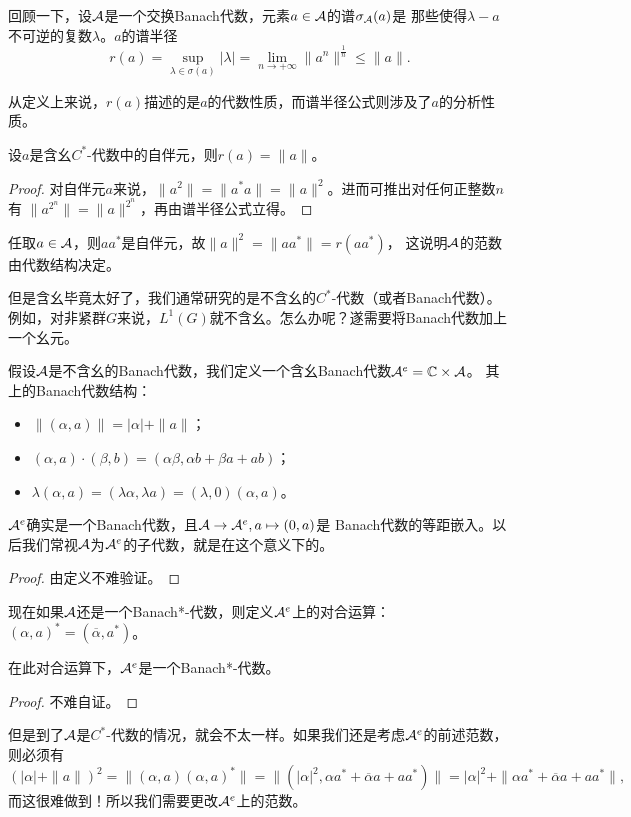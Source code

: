 回顾一下，设$\mathcal{A}$是一个交换Banach代数，元素$a \in \mathcal{A}$的谱$\sigma_{\mathcal{A}}(a)$是
那些使得$\lambda-a$不可逆的复数$\lambda$。$a$的谱半径
\[ r(a) = \sup_{\lambda \in \sigma(a)} |\lambda| 
= \lim_{n \to +\infty} \|a^n\|^{\frac{1}{n}} \leqslant \|a\|.\]

从定义上来说，$r(a)$描述的是$a$的代数性质，而谱半径公式则涉及了$a$的分析性质。
\begin{lemma}
    设$a$是含幺$C^*$-代数中的自伴元，则$r(a) = \|a\|$。
\end{lemma}
\begin{proof}
    对自伴元$a$来说，$\|a^2\| = \|a^*a\| = \|a\|^2$。进而可推出对任何正整数$n$有
    $\|a^{2^n}\| = \|a\|^{2^n}$，再由谱半径公式立得。
\end{proof}
\begin{remark}
    任取$a \in \mathcal{A}$，则$aa^*$是自伴元，故$\|a\|^2 = \|aa^*\| = r(aa^*)$，
    这说明$\mathcal{A}$的范数由代数结构决定。
\end{remark}
但是含幺毕竟太好了，我们通常研究的是不含幺的$C^*$-代数（或者Banach代数）。
例如，对非紧群$G$来说，$L^1(G)$就不含幺。怎么办呢？遂需要将Banach代数加上一个幺元。

假设$\mathcal{A}$是不含幺的Banach代数，我们定义一个含幺Banach代数$\mathcal{A}^e = \mathbb{C} \times \mathcal{A}$。
其上的Banach代数结构：
\begin{itemize}
    \item $\|(\alpha,a)\| = |\alpha| + \|a\|$；
    \item $(\alpha,a)\cdot(\beta,b) = (\alpha\beta,\alpha b+\beta a+ab)$；
    \item $\lambda(\alpha,a) = (\lambda \alpha,\lambda a) = (\lambda,0)(\alpha,a)$。
\end{itemize}
\begin{proposition}
    $\mathcal{A}^e$确实是一个Banach代数，且$\mathcal{A} \to \mathcal{A}^e,a \mapsto (0,a)$是
    Banach代数的等距嵌入。以后我们常视$\mathcal{A}$为$\mathcal{A}^e$的子代数，就是在这个意义下的。
\end{proposition}
\begin{proof}
    由定义不难验证。
\end{proof}
现在如果$\mathcal{A}$还是一个Banach*-代数，则定义$\mathcal{A}^e$上的对合运算：$(\alpha,a)^* = (\overline{\alpha},a^*)$。
\begin{proposition}
    在此对合运算下，$\mathcal{A}^e$是一个Banach*-代数。
\end{proposition}
\begin{proof}
    不难自证。
\end{proof}
但是到了$\mathcal{A}$是$C^*$-代数的情况，就会不太一样。如果我们还是考虑$\mathcal{A}^e$的前述范数，
则必须有\[(|\alpha|+\|a\|)^2 = \|(\alpha,a)(\alpha,a)^*\| 
= \|(|\alpha|^2,\alpha a^*+\overline{\alpha}a+aa^*)\| 
= |\alpha|^2+\|\alpha a^*+\overline{\alpha}a+aa^*\|,\]
而这很难做到！所以我们需要更改$\mathcal{A}^e$上的范数。

